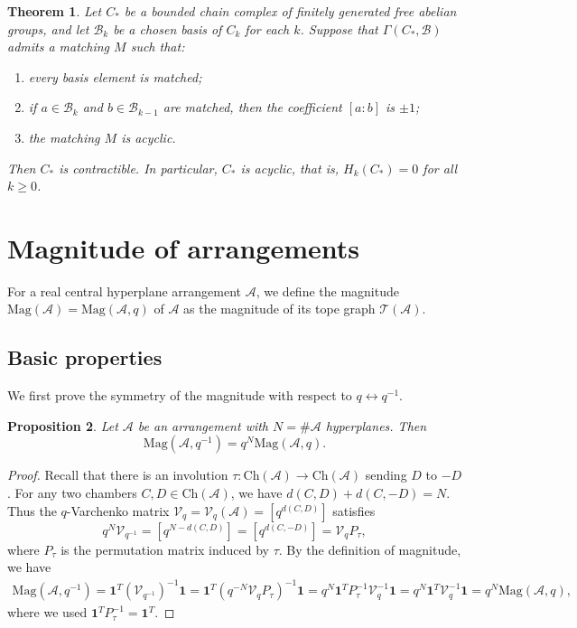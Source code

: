 \documentclass{amsart}
\numberwithin{equation}{section}
\newtheorem{thm}{Theorem}[section]
\newtheorem{prop}[thm]{Proposition}
\theoremstyle{plain}
\theoremstyle{remark}
\theoremstyle{definition}
\numberwithin{equation}{section}
\newcommand{\A}{\mathcal{A}}
\newcommand{\T}{\mathcal{T}}
\newcommand{\Mag}{\mathrm{Mag}}
\newcommand{\Ch}{\mathrm{Ch}}
\begin{document}
\begin{thm}\label{thm:complete-morse-matching}
Let $C_*$ be a bounded chain complex of finitely generated free abelian
groups, and let $\mathcal B_k$ be a chosen basis of
$C_k$ for each $k$. Suppose that $\Gamma(C_*,\mathcal B)$ admits a
matching $M$ such that:
\begin{enumerate}
    \item every basis element is matched;
    \item if $a\in \mathcal B_k$ and $b\in \mathcal B_{k-1}$ are matched,
    then the coefficient $[a:b]$ is $\pm 1$;
    \item the matching $M$ is acyclic.
\end{enumerate}
Then $C_*$ is contractible. In particular,
$C_*$ is acyclic, that is, $H_k(C_*)=0$ for all $k\geq 0$.
\end{thm}




\section{Magnitude of arrangements}

For a real central hyperplane arrangement $\A$, we define the magnitude $\Mag(\A)=\Mag(\A,q)$ of $\A$ as the magnitude of its tope graph $\T(\A)$.

\subsection{Basic properties}
We first prove the symmetry of the magnitude with respect to $q\leftrightarrow q^{-1}$.

\begin{prop}\label{reci}
 Let $\A$ be an arrangement with $N=\#\A$ hyperplanes. Then
 \[
 \Mag(\A,q^{-1})=q^N\Mag(\A,q).
 \]
\end{prop}
\begin{proof}
Recall that there is an involution $\tau:\Ch(\A)\to\Ch(\A)$ sending $D$ to $-D$.
For any two chambers $C,D\in\Ch(\A)$, we have $d(C,D)+d(C,-D)=N$. Thus the $q$-Varchenko matrix $\mathcal{V}_q=\mathcal{V}_q(\A)=[q^{d(C,D)}]$ satisfies
\[
q^N\mathcal{V}_{q^{-1}}=[q^{N-d(C,D)}]=[q^{d(C,-D)}]=\mathcal{V}_{q}P_{\tau},
\]
where $P_{\tau}$ is the permutation matrix induced by $\tau$. By the definition of magnitude, we have
\begin{align*}
\Mag(\A,q^{-1})=\mathbf{1}^T(\mathcal{V}_{q^{-1}})^{-1}\mathbf{1}=\mathbf{1}^T(q^{-N}\mathcal{V}_qP_{\tau})^{-1}\mathbf{1}=
q^{N}\mathbf{1}^TP_{\tau}^{-1}\mathcal{V}_q^{-1}\mathbf{1}=q^{N}\mathbf{1}^T\mathcal{V}_q^{-1}\mathbf{1}=q^{N}\Mag(\A,q),  
\end{align*}
where we used $\mathbf{1}^TP_{\tau}^{-1}=\mathbf{1}^T$.
\end{proof}
\end{document}
